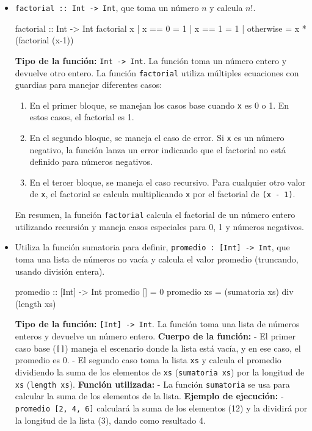 \documentclass{article}
\begin{document}
\begin{itemize}
    \item 
\verb|factorial :: Int -> Int|, que toma un número $n$ y calcula $n!$.
\begin{haskell}
    factorial :: Int -> Int
    factorial x | x == 0 = 1
                | x == 1 = 1
                | otherwise = x * (factorial (x-1))
\end{haskell}    
\textbf{Tipo de la función:} \verb|Int -> Int|. La función toma un número entero y devuelve otro entero.
La función \verb|factorial| utiliza múltiples ecuaciones con guardias para manejar diferentes casos:
\begin{enumerate}
\item 
En el primer bloque, se manejan los casos base cuando \verb|x| es 0 o 1. En estos casos, el factorial es 1.
\item 
En el segundo bloque, se maneja el caso de error. Si \verb|x| es un número negativo, la función lanza un error indicando que el factorial no está definido para números negativos.
\item 
En el tercer bloque, se maneja el caso recursivo. Para cualquier otro valor de \verb|x|, el factorial se calcula multiplicando \verb|x| por el factorial de \verb|(x - 1)|.
\end{enumerate}
En resumen, la función \verb|factorial| calcula el factorial de un número entero utilizando recursión y maneja casos especiales para 0, 1 y números negativos.

    \item 
Utiliza la función sumatoria para definir, \verb|promedio : [Int] -> Int|, que toma una lista de números no vacía y calcula el valor promedio (truncando, usando división entera).
\begin{haskell}
promedio :: [Int] -> Int
promedio [] = 0
promedio xs = (sumatoria xs) div (length xs)
\end{haskell}
\textbf{Tipo de la función:} \verb|[Int] -> Int|. La función toma una lista de números enteros y devuelve un número entero.
\textbf{Cuerpo de la función:}
- El primer caso base (\verb|[]|) maneja el escenario donde la lista está vacía, y en ese caso, el promedio es 0.
- El segundo caso toma la lista \verb|xs| y calcula el promedio dividiendo la suma de los elementos de \verb|xs| (\verb|sumatoria xs|) por la longitud de \verb|xs| (\verb|length xs|).
\textbf{Función utilizada:}
- La función \verb|sumatoria| se usa para calcular la suma de los elementos de la lista.
\textbf{Ejemplo de ejecución:}
- \verb|promedio [2, 4, 6]| calculará la suma de los elementos (12) y la dividirá por la longitud de la lista (3), dando como resultado 4.
\end{itemize}
\end{document}
